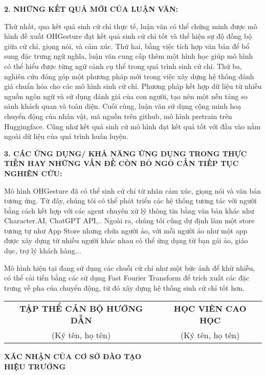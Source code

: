 \vspace{5pt}
{\MakeUppercase \Large \bfseries 2. NHỮNG KẾT QUẢ MỚI CỦA LUẬN VĂN:}


Thứ nhất, qua kết quả sinh cử chỉ thực tế, luận văn có thể chứng minh được mô hình đề xuất OHGesture đạt kết quả sinh cử chỉ tốt và thể hiện sự độ đồng bộ giữa cử chỉ, giọng nói, và cảm xúc.
Thứ hai, bằng việc tích hợp văn bản để bổ sung đặc trưng ngữ nghĩa, luận văn cung cấp thêm một hình học giúp mô hình có thể hiểu được từng ngữ cảnh cụ thể trong quá trình sinh cử chỉ.
Thứ ba, nghiên cứu đóng góp một phương pháp mới trong việc xây dựng hệ thống đánh giá chuẩn hóa cho các mô hình sinh cử chỉ. Phương pháp kết hợp dữ liệu từ nhiều nguồn ngôn ngữ và sử dụng đánh giá của con người, tạo nên một nền tảng so sánh khách quan và toàn diện.
Cuối cùng, luận văn sử dụng cộng minh hoạ chuyển động của nhân vật, mã nguồn trên github, mô hình pretrain trên Huggingface. Cũng như kết quả sinh cử mô hình đạt kết quả tốt với đầu vào nằm ngoài dữ liệu của quá trình huấn luyện.

\vspace{5pt}
{\MakeUppercase \Large \bfseries 3. CÁC ỨNG DỤNG/ KHẢ NĂNG ỨNG DỤNG TRONG THỰC TIỄN HAY NHỮNG VẤN ĐỀ CÒN BỎ NGỎ CẦN TIẾP TỤC NGHIÊN CỨU:}


Mô hình OHGesture đã có thể sinh cử chỉ từ nhãn cảm xúc, giọng nói và văn bản tương ứng.
Từ đây, chúng tôi có thể phát triển các hệ thống tương tác với người bằng cách kết hợp với các agent chuyên xử lý thông tin bằng văn bản khác như Character.AI, ChatGPT API,.. Ngoài ra, chúng tôi cũng dự định làm một store tương tự như App Store nhưng chứa người ảo, với mỗi người ảo như một app được xây dựng từ nhiều người khác nhau có thể ứng dụng từ bạn gái ảo, giáo dục, trợ lý khách hàng...

Mô hình hiện tại đang sử dụng các chuỗi cử chỉ như một bức ảnh để khử nhiễu, có thể cải tiến bằng các sử dụng Fast Fourier Transform để trích xuất các đặc trưng về pha của chuyển động, từ đó xây dựng hệ thống sinh cử chỉ tốt hơn.


\begin{center}
    \begin{tabular}{c c}
        \textbf{TẬP THỂ CÁN BỘ HƯỚNG DẪN} & \textbf{HỌC VIÊN CAO HỌC} \\
        (Ký tên, họ tên) & (Ký tên, họ tên) \\
    \end{tabular}
    
    \vspace{3cm} %
    
    \textbf{XÁC NHẬN CỦA CƠ SỞ ĐÀO TẠO} \\
    \textbf{HIỆU TRƯỞNG}
\end{center}
